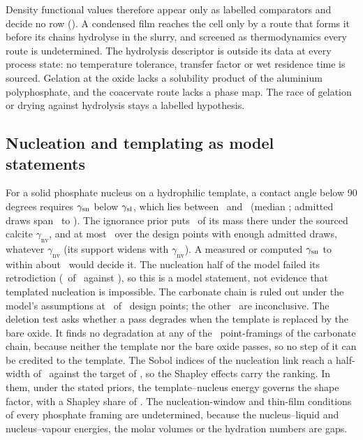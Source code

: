 Density functional values therefore appear only as labelled comparators and decide no row (). %
A condensed film reaches the cell only by a route that forms it before its chains hydrolyse in the slurry, and screened as thermodynamics every route is undetermined. %
The hydrolysis descriptor is outside its data at every process state: no temperature tolerance, transfer factor or wet residence time is sourced. %
Gelation at the oxide lacks a solubility product of the aluminium polyphosphate, and the coacervate route lacks a phase map. %
The race of gelation or drying against hydrolysis stays a labelled hypothesis. %

\subsection{Nucleation and templating as model statements}\label{sec:res-nucleation}
For a solid phosphate nucleus on a hydrophilic template, a contact angle below 90 degrees requires $\gamma_\mathrm{sn}$ below $\gamma_\mathrm{sl}$, which lies between \NumNucGslQFive\ and \NumNucGslQNinetyFive\ (median \NumNucGslMedian; admitted draws span \NumNucGslMin\ to \NumNucGslMax). %
The ignorance prior puts \NumNucMassSourced\ of its mass there under the sourced calcite $\gamma_\mathrm{nv}$, and at most \NumNucMassDesignMax\ over the design points with enough admitted draws, whatever $\gamma_\mathrm{nv}$ (its support widens with $\gamma_\mathrm{nv}$). %
A measured or computed $\gamma_\mathrm{sn}$ to within about \NumNucDecideWithin\ would decide it. %
The nucleation half of the model failed its retrodiction (\NumRetroCorrect\ of \NumRetroUsableCases\ against \NumRetroPassCount), so this is a model statement, not evidence that templated nucleation is impossible. %
The carbonate chain is ruled out under the model's assumptions at \NumNucLinkFalsified\ of \NumNucLinkDesigns\ design points; the other \NumNucLinkInconclusive\ are inconclusive. %
The deletion test asks whether a pass degrades when the template is replaced by the bare oxide. %
It finds no degradation at any of the \NumDeletionFramings\ point-framings of the carbonate chain, because neither the template nor the bare oxide passes, so no step of it can be credited to the template. %
The Sobol indices of the nucleation link reach a half-width of \NumSobolNucHalfWidth\ against the target of \NumSobolNucTarget, so the Shapley effects carry the ranking. %
In them, under the stated priors, the template--nucleus energy governs the shape factor, with a Shapley share of \NumShapleyGsnShape. %
The nucleation-window and thin-film conditions of every phosphate framing are undetermined, because the nucleus--liquid and nucleus--vapour energies, the molar volumes or the hydration numbers are gaps. %

